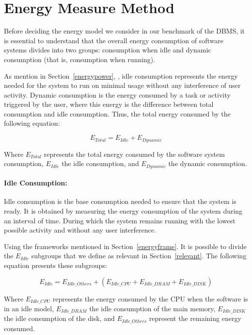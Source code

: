 
\section{Energy Measure Method}

\label{sc:enerymodel}

Before deciding the energy model we consider in our benchmark of the DBMS, it is essential to understand that the overall energy consumption of software systems divides into two groups: consumption when idle and dynamic consumption (that is, consumption when running). 

As mention in Section~\ref{energypower}, , idle consumption represents the energy needed for the system to run on minimal usage without any interference of user activity. Dynamic consumption is the energy consumed by a task or activity triggered by the user, where this energy is the difference between total consumption and idle consumption. Thus, the total energy consumed by the following equation:

\begin{equation}
E_{Total} = E_{Idle} + E_{Dynamic}
\end{equation}$
$

Where $E_{Total}$ represents the total energy consumed by the software system consumption,  $E_{Idle}$ the idle consumption, and $E_{Dynamic}$ the dynamic consumption.

\paragraph{Idle Consumption:} Idle consumption is the base consumption needed to ensure that the system is ready. It is obtained by measuring the energy consumption of the system during an interval of time. During which the system remains running with the lowest possible activity and without any user interference. 

Using the frameworks mentioned in Section~\ref{energyframe}. It is possible to divide the $E_{Idle}$ subgroups that we define as relevant in Section~\ref{relevant}. The following equation presents these subgroups:

\begin{equation}
E_{Idle} = E_{Idle\_Others} + ( E_{Idle\_CPU} + E_{Idle\_DRAM} + E_{Idle\_DISK})
\end{equation}$
$

Where $E_{Idle\_CPU}$ represents the energy consumed by the CPU when the software is in an idle model, $E_{Idle\_DRAM}$ the idle consumption of the main memory, $E_{Idle\_DISK}$ the idle consumption of the disk, and $E_{Idle\_Others}$ represent the remaining energy consumed.

